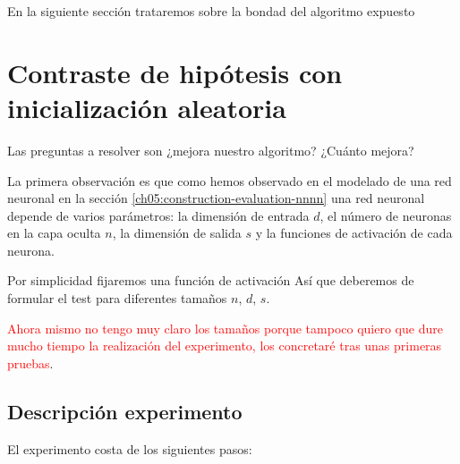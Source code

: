 

En la siguiente sección trataremos sobre la bondad del algoritmo expuesto

\section{Contraste de hipótesis con inicialización aleatoria} 
\label{ch07:experimento-1} 

Las preguntas a resolver son ¿mejora nuestro algoritmo? ¿Cuánto mejora?

La primera observación  es que como
hemos observado en el modelado de una red neuronal 
en la sección \ref{ch05:construction-evaluation-nnnn}
una red neuronal depende de varios parámetros:
la dimensión de entrada $d$, el número de neuronas en la capa oculta $n$, la dimensión de salida $s$ 
y la funciones de activación de cada neurona.  

Por simplicidad fijaremos una función de activación 
Así que deberemos de formular el test 
para diferentes tamaños $n$, $d$, $s$. 

\textcolor{red}{Ahora mismo no tengo muy claro 
los tamaños porque tampoco quiero que dure mucho tiempo la realización del experimento, los concretaré tras unas primeras pruebas}. 

\subsection{Descripción experimento}

El experimento costa de los siguientes pasos: 


